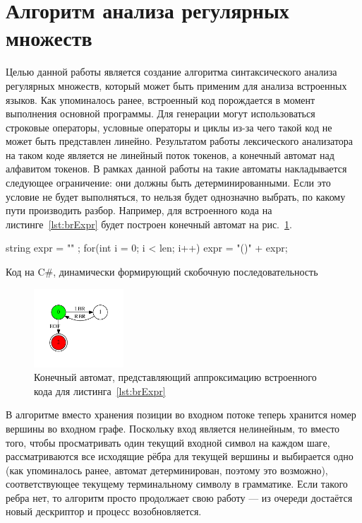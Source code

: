 \section{Алгоритм анализа регулярных множеств}
Целью данной работы является создание алгоритма синтаксического анализа регулярных множеств, который может быть применим для анализа встроенных языков. Как упоминалось ранее, встроенный код порождается в момент выполнения основной программы. Для генерации могут использоваться строковые операторы, условные операторы и циклы из-за чего такой код не может быть представлен линейно. Результатом работы лексического анализатора на таком коде является не линейный поток токенов, а конечный автомат над алфавитом токенов. В рамках данной работы на такие автоматы накладывается следующее ограничение: они должны быть детерминированными. Если это условие не будет выполняться, то нельзя будет однозначно выбрать, по какому пути производить разбор. Например, для встроенного кода на листинге~\ref{lst:brExpr} будет построен конечный автомат на рис.~\ref{input}.

\begin{listing}
\begin{pyglist}[language=csharp,numbers=left,numbersep=5pt]
 string expr = "" ;
 for(int i = 0; i < len; i++) 
 {
     expr = "()" + expr;
 }
\end{pyglist}
\caption{Код на C\#, динамически формирующий скобочную последовательность}
\label{lst:brExpr}
\end{listing}

\begin{figure}[h]
 \centering
 \includegraphics[width=0.3\textwidth]{Ragozina/pics/input.pdf}
 \caption{Конечный автомат, представляющий аппроксимацию встроенного кода для листинга~\ref{lst:brExpr} }
 \label{input}
\end{figure}

В алгоритме вместо хранения позиции во входном потоке теперь хранится номер вершины во входном графе. Поскольку вход является нелинейным, то вместо того, чтобы просматривать один текущий входной символ на каждом шаге, рассматриваются все исходящие рёбра для текущей вершины и выбирается одно (как упоминалось ранее, автомат детерминирован, поэтому это возможно), соответствующее текущему терминальному символу в грамматике. Если такого ребра нет, то алгоритм просто продолжает свою работу --- из очереди достаётся новый дескриптор и процесс возобновляется. 

